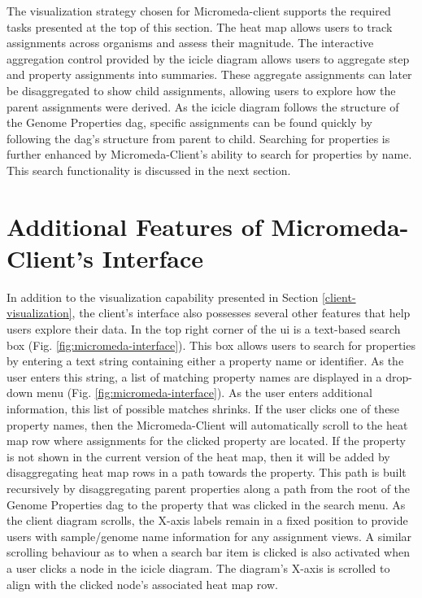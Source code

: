 The visualization strategy chosen for Micromeda-client supports the required 
tasks presented at the top of this section. The heat map allows users to track 
assignments across organisms and assess their magnitude. The interactive 
aggregation control provided by the icicle diagram allows users to aggregate 
step and property assignments into summaries. These aggregate assignments can 
later be disaggregated to show child assignments, allowing users to explore how 
the parent assignments were derived. As the icicle diagram follows the structure 
of the Genome Properties \gls{dag}, specific assignments can be found quickly by 
following the \gls{dag}'s structure from parent to child. Searching for 
properties is further enhanced by Micromeda-Client's ability to search for 
properties by name. This search functionality is discussed in the next section.

\section{Additional Features of Micromeda-Client's Interface} 
\label{client-additional-features}

In addition to the visualization capability presented in Section 
\ref{client-visualization}, the client's interface also possesses several other 
features that help users explore their data. In the top right corner of the 
\gls{ui} is a text-based search box (Fig. \ref{fig:micromeda-interface}). This 
box allows users to search for properties by entering a text string containing 
either a property name or identifier. As the user enters this string, a list of 
matching property names are displayed in a drop-down menu (Fig. 
\ref{fig:micromeda-interface}). As the user enters additional information, this 
list of possible matches shrinks. If the user clicks one of these property 
names, then the Micromeda-Client will automatically scroll to the heat map row 
where assignments for the clicked property are located. If the property is not 
shown in the current version of the heat map, then it will be added by 
disaggregating heat map rows in a path towards the property. This path is built 
recursively by disaggregating parent properties along a path from the root of 
the Genome Properties \gls{dag} to the property that was clicked in the search 
menu. As the client diagram scrolls, the X-axis labels remain in a fixed 
position to provide users with sample/genome name information for any assignment 
views. A similar scrolling behaviour as to when a search bar item is clicked is 
also activated when a user clicks a node in the icicle diagram. The diagram's 
X-axis is scrolled to align with the clicked node's associated heat map row.

